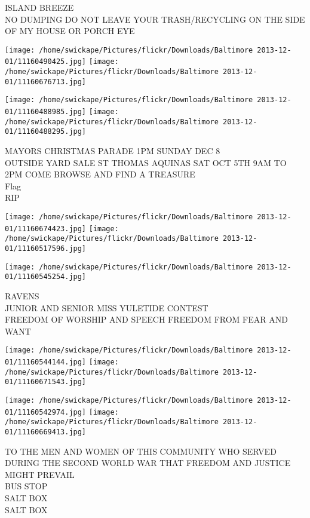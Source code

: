 \documentclass[10pt,letterpaper]{article}
\begin{document}
ISLAND BREEZE\\
NO DUMPING DO NOT LEAVE YOUR TRASH/RECYCLING ON THE SIDE OF MY HOUSE OR PORCH EYE
\pagebreak

\texttt{[image: /home/swickape/Pictures/flickr/Downloads/Baltimore 2013-12-01/11160490425.jpg]}
\texttt{[image: /home/swickape/Pictures/flickr/Downloads/Baltimore 2013-12-01/11160676713.jpg]}

\texttt{[image: /home/swickape/Pictures/flickr/Downloads/Baltimore 2013-12-01/11160488985.jpg]}
\texttt{[image: /home/swickape/Pictures/flickr/Downloads/Baltimore 2013-12-01/11160488295.jpg]}

MAYORS CHRISTMAS PARADE 1PM SUNDAY DEC 8\\
OUTSIDE YARD SALE ST THOMAS AQUINAS SAT OCT 5TH 9AM TO 2PM COME BROWSE AND FIND A TREASURE\\
Flag\\
RIP
\pagebreak

\texttt{[image: /home/swickape/Pictures/flickr/Downloads/Baltimore 2013-12-01/11160674423.jpg]}
\texttt{[image: /home/swickape/Pictures/flickr/Downloads/Baltimore 2013-12-01/11160517596.jpg]}

\vspace{0.25in}
\texttt{[image: /home/swickape/Pictures/flickr/Downloads/Baltimore 2013-12-01/11160545254.jpg]}

RAVENS\\
JUNIOR AND SENIOR MISS YULETIDE CONTEST\\
FREEDOM OF WORSHIP AND SPEECH FREEDOM FROM FEAR AND WANT
\pagebreak

\texttt{[image: /home/swickape/Pictures/flickr/Downloads/Baltimore 2013-12-01/11160544144.jpg]}
\texttt{[image: /home/swickape/Pictures/flickr/Downloads/Baltimore 2013-12-01/11160671543.jpg]}

\texttt{[image: /home/swickape/Pictures/flickr/Downloads/Baltimore 2013-12-01/11160542974.jpg]}
\texttt{[image: /home/swickape/Pictures/flickr/Downloads/Baltimore 2013-12-01/11160669413.jpg]}

TO THE MEN AND WOMEN OF THIS COMMUNITY WHO SERVED DURING THE SECOND WORLD WAR THAT FREEDOM AND JUSTICE MIGHT PREVAIL\\
BUS STOP\\
SALT BOX\\
SALT BOX
\pagebreak
\end{document}
